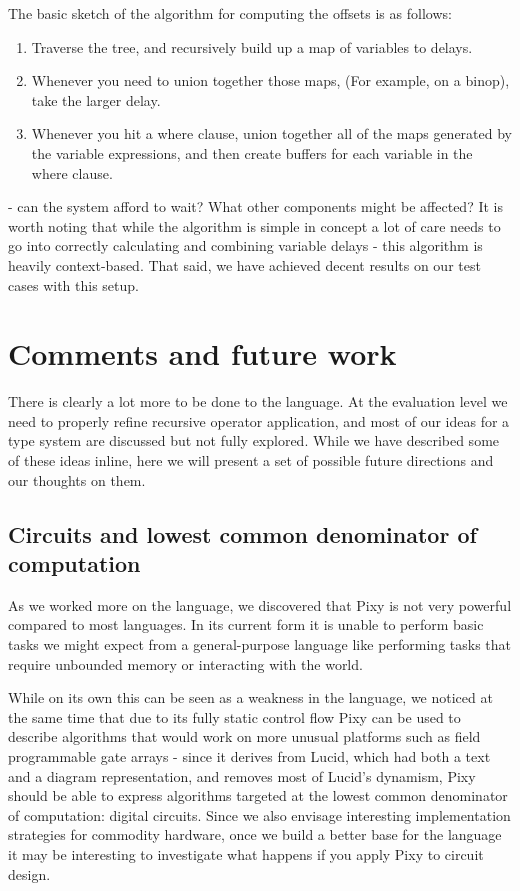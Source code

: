 \documentclass{scrartcl}
\begin{document}
    The basic sketch of the algorithm for computing the offsets is as follows:
    \begin{enumerate}
        \item Traverse the tree, and recursively build up a map of variables to delays.
        \item Whenever you need to union together those maps, (For example, on a binop), take the 
            larger delay.
        \item Whenever you hit a where clause, union together all of the maps generated by the variable
            expressions, and then create buffers for each variable in the where clause.
    \end{enumerate}
- can the system afford to wait? What other components might be affected?
    It is worth noting that while the algorithm is simple in concept a lot of care needs to go into correctly calculating and combining variable delays - this algorithm is heavily context-based. That said, we have achieved decent results on our test cases with this setup.


    \section{Comments and future work}
    
    There is clearly a lot more to be done to the language. At the evaluation level we need to properly refine recursive operator application, and most of our ideas for a type system are discussed but not fully explored. While we have described some of these ideas inline, here we will present a set of possible future directions and our thoughts on them.
    
    \subsection{Circuits and lowest common denominator of computation}
    
    As we worked more on the language, we discovered that Pixy is not very powerful compared to most languages. In its current form it is unable to perform basic tasks we might expect from a general-purpose language like performing tasks that require unbounded memory or interacting with the world.
    
    While on its own this can be seen as a weakness in the language, we noticed at the same time that due to its fully static control flow Pixy can be used to describe algorithms that would work on more unusual platforms such as field programmable gate arrays - since it derives from Lucid, which had both a text and a diagram representation, and removes most of Lucid's dynamism, Pixy should be able to express algorithms targeted at the lowest common denominator of computation: digital circuits. Since we also envisage interesting implementation strategies for commodity hardware, once we build a better base for the language it may be interesting to investigate what happens if you apply Pixy to circuit design.
    
\end{document}
